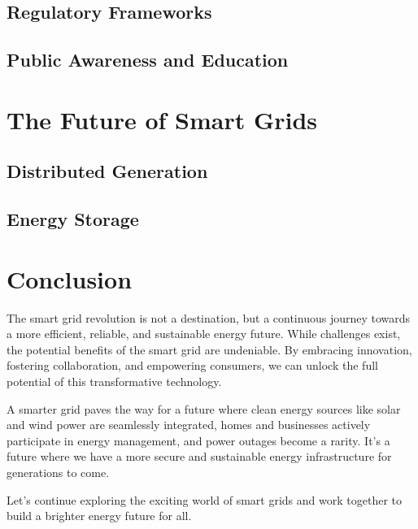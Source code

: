 \subsection{Regulatory Frameworks}
\subsection{Public Awareness and Education}
\section{The Future of Smart Grids }  
\subsection{Distributed Generation}
\subsection{Energy Storage}
\newpage
\section*{Conclusion}
The smart grid revolution is not a destination, but a continuous journey towards a more efficient, reliable, and sustainable energy future. While challenges exist, the potential benefits of the smart grid are undeniable. By embracing innovation, fostering collaboration, and empowering consumers, we can unlock the full potential of this transformative technology.

A smarter grid paves the way for a future where clean energy sources like solar and wind power are seamlessly integrated, homes and businesses actively participate in energy management, and power outages become a rarity. It's a future where we have a more secure and sustainable energy infrastructure for generations to come.

Let's continue exploring the exciting world of smart grids and work together to build a brighter energy future for all.